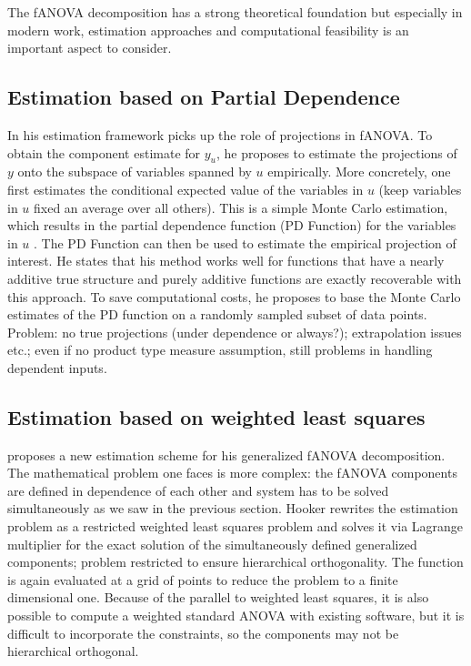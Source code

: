 The fANOVA decomposition has a strong theoretical foundation but especially in modern work, estimation approaches and computational feasibility is an important aspect to consider.

\subsection*{Estimation based on Partial Dependence}
In his estimation framework \cite{hooker2004} picks up the role of projections in fANOVA. To obtain the component estimate for $y_u$, he proposes to estimate the projections of $y$ onto the subspace of variables spanned by $u$ empirically.
More concretely, one first estimates the conditional expected value of the variables in $u$ (keep variables in $u$ fixed an average over all others). This is a simple Monte Carlo estimation, which results in the partial dependence function (PD Function) for the variables in $u$ \citep{hooker2004}.
The PD Function can then be used to estimate the empirical projection of interest. He states that his method works well for functions that have a nearly additive true structure and purely additive functions are exactly recoverable with this approach. To save computational costs, he proposes to base the Monte Carlo estimates of the PD function on a randomly sampled subset of data points.
Problem: no true projections (under dependence or always?); extrapolation issues etc.; even if no product type measure assumption, still problems in handling dependent inputs.

\subsection*{Estimation based on weighted least squares}
\cite{hooker2007} proposes a new estimation scheme for his generalized fANOVA decomposition. The mathematical problem one faces is more complex: the fANOVA components are defined in dependence of each other and system has to be solved simultaneously as we saw in the previous section.
Hooker rewrites the estimation problem as a restricted weighted least squares problem and solves it via Lagrange multiplier for the exact solution of the simultaneously defined generalized components; problem restricted to ensure hierarchical orthogonality.
The function is again evaluated at a grid of points to reduce the problem to a finite dimensional one. 
Because of the parallel to weighted least squares, it is also possible to compute a weighted standard ANOVA with existing software, but it is difficult to incorporate the constraints, so the components may not be hierarchical orthogonal.

